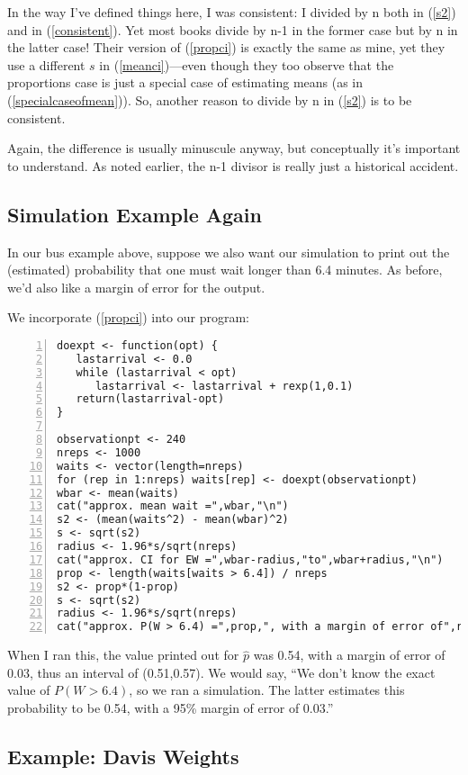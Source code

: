 In the way I've defined things here, I was consistent:  I divided by n
both in (\ref{s2}) and in (\ref{consistent}).  Yet most books divide by
n-1 in the former case but by n in the latter case!  Their version of
(\ref{propci}) is exactly the same as mine, yet they use a different $s$
in (\ref{meanci})---even though they too observe that the proportions
case is just a special case of estimating means (as in
(\ref{specialcaseofmean})).  So, another reason to divide by n in
(\ref{s2}) is to be consistent.

Again, the difference is usually minuscule anyway, but conceptually it's
important to understand.  As noted earlier, the n-1 divisor is really
just a historical accident.

\subsection{Simulation Example Again}

In our bus example above, suppose we also want our simulation to print
out the (estimated) probability that one must wait longer than 6.4
minutes.  As before, we'd also like a margin of error for the output.

We incorporate (\ref{propci}) into our program:

\begin{Verbatim}[fontsize=\relsize{-2},numbers=left]
doexpt <- function(opt) {
   lastarrival <- 0.0
   while (lastarrival < opt)
      lastarrival <- lastarrival + rexp(1,0.1)
   return(lastarrival-opt)
}

observationpt <- 240
nreps <- 1000
waits <- vector(length=nreps)
for (rep in 1:nreps) waits[rep] <- doexpt(observationpt)
wbar <- mean(waits)
cat("approx. mean wait =",wbar,"\n")
s2 <- (mean(waits^2) - mean(wbar)^2)
s <- sqrt(s2)
radius <- 1.96*s/sqrt(nreps)
cat("approx. CI for EW =",wbar-radius,"to",wbar+radius,"\n")
prop <- length(waits[waits > 6.4]) / nreps
s2 <- prop*(1-prop)
s <- sqrt(s2)
radius <- 1.96*s/sqrt(nreps)
cat("approx. P(W > 6.4) =",prop,", with a margin of error of",radius,"\n")
\end{Verbatim}

When I ran this, the value printed out for $\widehat{p}$ was 0.54,
with a margin of error of 0.03, thus an interval of (0.51,0.57).
We would say, ``We don't know the exact value of $P(W > 6.4)$, so we ran
a simulation.  The latter estimates this probability to be 0.54, with a
95\% margin of error of 0.03.''

\subsection{Example:  Davis Weights} 
\label{severalexamples}


